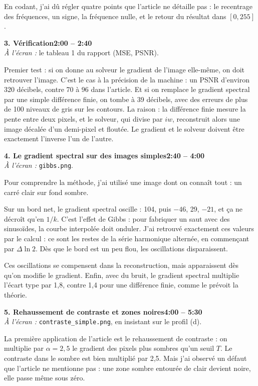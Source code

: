 \documentclass[11pt,a4paper]{article}
\newcommand{\partie}[3]{\bigskip\noindent\colorbox{gray!15}{\parbox{\dimexpr\linewidth-2\fboxsep}{%
  \textbf{#1}\hfill\textbf{#2}\\ \small\textit{À l'écran :} #3}}\par}
\begin{document}
En codant, j'ai dû régler quatre points que l'article ne détaille pas : le recentrage des fréquences, un
signe, la fréquence nulle, et le retour du résultat dans $[0,255]$.

\partie{3. Vérification}{2:00 -- 2:40}{le tableau 1 du rapport (MSE, PSNR).}

Premier test : si on donne au solveur le gradient de l'image elle-même, on doit retrouver l'image. C'est
le cas à la précision de la machine : un PSNR d'environ 320 décibels, contre 70 à 96 dans l'article. Et
si on remplace le gradient spectral par une simple différence finie, on tombe à 39 décibels, avec des
erreurs de plus de 100 niveaux de gris sur les contours. La raison : la différence finie mesure la pente
entre deux pixels, et le solveur, qui divise par $iw$, reconstruit alors une image décalée d'un
demi-pixel et floutée. Le gradient et le solveur doivent être exactement l'inverse l'un de l'autre.

\partie{4. Le gradient spectral sur des images simples}{2:40 -- 4:00}{\texttt{gibbs.png}.}

Pour comprendre la méthode, j'ai utilisé une image dont on connaît tout : un carré clair sur fond sombre.

Sur un bord net, le gradient spectral oscille : 104, puis $-46$, 29, $-21$, et ça ne décroît qu'en
$1/k$. C'est l'effet de Gibbs : pour fabriquer un saut avec des sinusoïdes, la courbe interpolée doit
onduler. J'ai retrouvé exactement ces valeurs par le calcul : ce sont les restes de la série harmonique
alternée, en commençant par $\Delta \ln 2$. Dès que le bord est un peu flou, les oscillations
disparaissent.

Ces oscillations se compensent dans la reconstruction, mais apparaissent dès qu'on modifie le gradient.
Enfin, avec du bruit, le gradient spectral multiplie l'écart type par 1,8, contre 1,4 pour une différence
finie, comme le prévoit la théorie.

\partie{5. Rehaussement de contraste et zones noires}{4:00 -- 5:30}{\texttt{contraste\_simple.png},
en insistant sur le profil (d).}

La première application de l'article est le rehaussement de contraste : on multiplie par $\alpha = 2{,}5$
le gradient des pixels plus sombres qu'un seuil $T$. Le contraste dans le sombre est bien multiplié par
2,5. Mais j'ai observé un défaut que l'article ne mentionne pas : une zone sombre entourée de clair
devient noire, elle passe même sous zéro.
\end{document}
